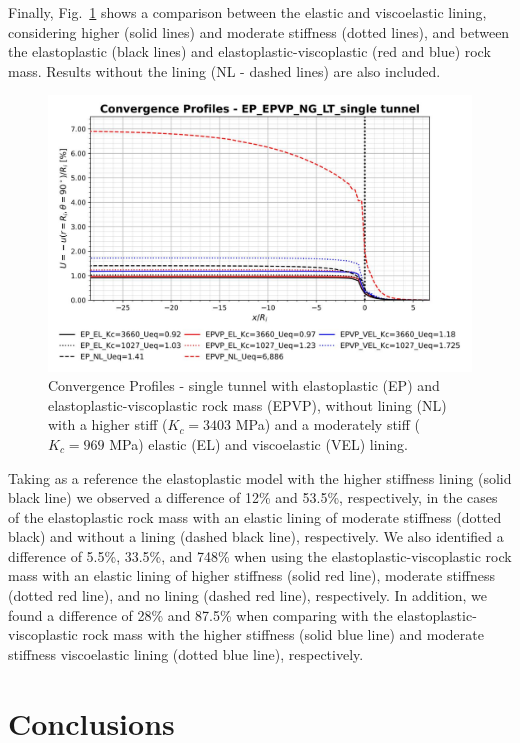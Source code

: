 \documentclass[a4paper,fleqn]{cas-sc}
\begin{document}
Finally, Fig.~\ref{EP_EPVP_NG_LT_single tunnel} shows a comparison between the elastic and viscoelastic lining, considering higher (solid lines) and moderate stiffness (dotted lines), and between the elastoplastic (black lines) and elastoplastic-viscoplastic (red and blue) rock mass. Results without the lining (NL - dashed lines) are also included.
\begin{figure}[h!]
	\centering
	\includegraphics[scale=0.7]{Convergence Profiles - EP_EPVP_NG_LT_single tunnel.pdf}
	\caption{Convergence Profiles - single tunnel with elastoplastic (EP) and elastoplastic-viscoplastic rock mass (EPVP), without lining (NL) with a higher stiff ($K_c = 3403$ MPa) and a moderately stiff ($K_c = 969$ MPa) elastic (EL) and viscoelastic (VEL) lining.}
	\label{EP_EPVP_NG_LT_single tunnel}
\end{figure}
\FloatBarrier
Taking as a reference the elastoplastic model with the higher stiffness lining (solid black line) we observed a difference of 12\% and 53.5\%, respectively, in the cases of the elastoplastic rock mass with an elastic lining of moderate stiffness (dotted black) and without a lining (dashed black line), respectively. We also identified a difference of 5.5\%, 33.5\%, and 748\% when using the elastoplastic-viscoplastic rock mass with an elastic lining of higher stiffness (solid red line), moderate stiffness (dotted red line), and no lining (dashed red line), respectively. In addition, we found a difference of 28\% and 87.5\% when comparing with the elastoplastic-viscoplastic rock mass with the higher stiffness (solid blue line) and moderate stiffness viscoelastic lining (dotted blue line), respectively.

\section{Conclusions}\label{}
\end{document}
